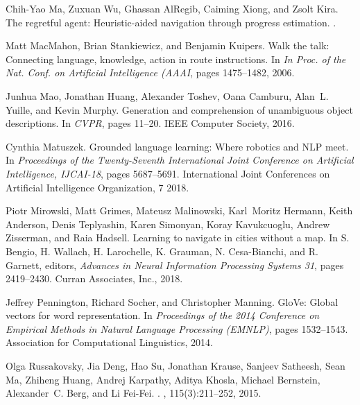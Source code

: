 \documentclass[10pt,twocolumn,letterpaper]{article}
\begin{document}
\begin{thebibliography}{10}
Chih-Yao Ma, Zuxuan Wu, Ghassan AlRegib, Caiming Xiong, and Zsolt Kira.
\newblock The regretful agent: Heuristic-aided navigation through progress
  estimation.
.

Matt MacMahon, Brian Stankiewicz, and Benjamin Kuipers.
\newblock Walk the talk: Connecting language, knowledge, action in route
  instructions.
\newblock In {\em In Proc. of the Nat. Conf. on Artificial Intelligence (AAAI},
  pages 1475--1482, 2006.

Junhua Mao, Jonathan Huang, Alexander Toshev, Oana Camburu, Alan~L. Yuille, and
  Kevin Murphy.
\newblock Generation and comprehension of unambiguous object descriptions.
\newblock In {\em {CVPR}}, pages 11--20. {IEEE} Computer Society, 2016.

Cynthia Matuszek.
\newblock Grounded language learning: Where robotics and {NLP} meet.
\newblock In {\em Proceedings of the Twenty-Seventh International Joint
  Conference on Artificial Intelligence, {IJCAI-18}}, pages 5687--5691.
  International Joint Conferences on Artificial Intelligence Organization, 7
  2018.

Piotr Mirowski, Matt Grimes, Mateusz Malinowski, Karl~Moritz Hermann, Keith
  Anderson, Denis Teplyashin, Karen Simonyan, Koray Kavukcuoglu, Andrew
  Zisserman, and Raia Hadsell.
\newblock Learning to navigate in cities without a map.
\newblock In S. Bengio, H. Wallach, H. Larochelle, K. Grauman, N. Cesa-Bianchi,
  and R. Garnett, editors, {\em Advances in Neural Information Processing
  Systems 31}, pages 2419--2430. Curran Associates, Inc., 2018.

Jeffrey Pennington, Richard Socher, and Christopher Manning.
\newblock Glo{V}e: Global vectors for word representation.
\newblock In {\em Proceedings of the 2014 Conference on Empirical Methods in
  Natural Language Processing (EMNLP)}, pages 1532--1543. Association for
  Computational Linguistics, 2014.

Olga Russakovsky, Jia Deng, Hao Su, Jonathan Krause, Sanjeev Satheesh, Sean Ma,
  Zhiheng Huang, Andrej Karpathy, Aditya Khosla, Michael Bernstein,
  Alexander~C. Berg, and Li Fei-Fei.
.
,
  115(3):211--252, 2015.


\end{thebibliography}
\end{document}
